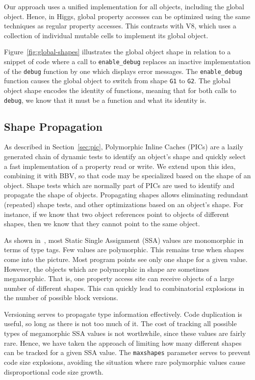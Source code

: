 \documentclass[preprint]{sigplanconf}
\begin{document}
Our approach uses a unified implementation for all objects, including the
global object. Hence, in Higgs, global property accesses can be optimized
using the same techniques as regular property accesses. This contrasts with
V8, which uses a collection of individual mutable cells to implement its
global object.

Figure~\ref{fig:global-shapes} illustrates the global object shape in relation
to a snippet of code where a call to {\tt enable\_debug} replaces an
inactive implementation of the {\tt debug} function by one which
displays error messages. The {\tt enable\_debug} function causes the global
object to switch from shape {\tt G1} to {\tt G2}. The global object shape
encodes the identity of functions, meaning that for both calls to
{\tt debug}, we know that it must be a function and what its identity is.

\subsection{Shape Propagation}\label{sec:shape_prop}

As described in Section~\ref{sec:pic}, Polymorphic Inline Caches (PICs) are
a lazily generated chain of dynamic tests to identify an object's
shape and quickly select a fast implementation of a property read or write.
We extend upon this idea, combining it with BBV,
so that code may be specialized based on the shape of an object. Shape tests
which are normally part of PICs are used to identify and propagate the
shape of objects. Propagating shapes allows eliminating redundant (repeated)
shape tests, and other optimizations based on an object's shape. For instance,
if we know that two object references point to objects of different shapes,
then we know that they cannot point to the same object.

As shown in~\cite{bbv_ecoop}, most Static Single Assignment (SSA) values are
monomorphic in terms of type tags. Few values are polymorphic. This remains
true when shapes come into the picture. Most program points see only one shape
for a given value. However, the objects which are polymorphic in shape are
sometimes megamorphic. That is, one property access site can receive objects
of a large number of different shapes. This can quickly lead to combinatorial
explosions in the number of possible block versions.

Versioning serves to propagate type information effectively. Code duplication
is useful, so long as there is not too much of it. The cost
of tracking all possible types of megamorphic SSA values is not worthwhile,
since these values are fairly rare. Hence, we have taken the approach of
limiting how many different shapes can be tracked for a given SSA value.
The {\tt maxshapes} parameter serves to prevent code size explosions,
avoiding the situation where rare polymorphic values cause disproportional
code size growth.
\end{document}
